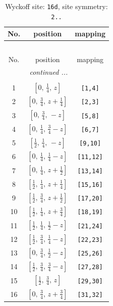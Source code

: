 \documentclass[fleqn,8pt]{jsarticle}
\begin{document}
\renewcommand{\arraystretch}{1.2}
\begin{longtable}{ccc}
\caption{Wyckoff site: {\tt 16d}, site symmetry: {\tt 2..}}
 \\
 \hline \hline
No. & position & mapping \\ \hline \endfirsthead

\multicolumn{2}{l}{\tablename\ \thetable{}} \\
 \hline \hline
No. & position & mapping \\ \hline \endhead

 \hline \hline
\multicolumn{2}{r}{\footnotesize\it continued ...} \\ \endfoot

 \hline \hline
\multicolumn{2}{r}{} \\ \endlastfoot

1 & $\left[ 0,\, \frac{1}{4},\, z \right]$ & {\tt [1,4]} \\ \hline
2 & $\left[ 0,\, \frac{3}{4},\, z + \frac{1}{4} \right]$ & {\tt [2,3]} \\ \hline
3 & $\left[ 0,\, \frac{3}{4},\, - z \right]$ & {\tt [5,8]} \\ \hline
4 & $\left[ 0,\, \frac{1}{4},\, \frac{3}{4} - z \right]$ & {\tt [6,7]} \\ \hline
5 & $\left[ \frac{1}{2},\, \frac{1}{4},\, - z \right]$ & {\tt [9,10]} \\ \hline
6 & $\left[ 0,\, \frac{1}{4},\, \frac{1}{4} - z \right]$ & {\tt [11,12]} \\ \hline
7 & $\left[ 0,\, \frac{1}{4},\, z + \frac{1}{2} \right]$ & {\tt [13,14]} \\ \hline
8 & $\left[ \frac{1}{2},\, \frac{1}{4},\, z + \frac{1}{4} \right]$ & {\tt [15,16]} \\ \hline
9 & $\left[ \frac{1}{2},\, \frac{3}{4},\, z + \frac{1}{2} \right]$ & {\tt [17,20]} \\ \hline
10 & $\left[ \frac{1}{2},\, \frac{1}{4},\, z + \frac{3}{4} \right]$ & {\tt [18,19]} \\ \hline
11 & $\left[ \frac{1}{2},\, \frac{1}{4},\, \frac{1}{2} - z \right]$ & {\tt [21,24]} \\ \hline
12 & $\left[ \frac{1}{2},\, \frac{3}{4},\, \frac{1}{4} - z \right]$ & {\tt [22,23]} \\ \hline
13 & $\left[ 0,\, \frac{3}{4},\, \frac{1}{2} - z \right]$ & {\tt [25,26]} \\ \hline
14 & $\left[ \frac{1}{2},\, \frac{3}{4},\, \frac{3}{4} - z \right]$ & {\tt [27,28]} \\ \hline
15 & $\left[ \frac{1}{2},\, \frac{3}{4},\, z \right]$ & {\tt [29,30]} \\ \hline
16 & $\left[ 0,\, \frac{3}{4},\, z + \frac{3}{4} \right]$ & {\tt [31,32]} \\
\end{longtable}
\end{document}
